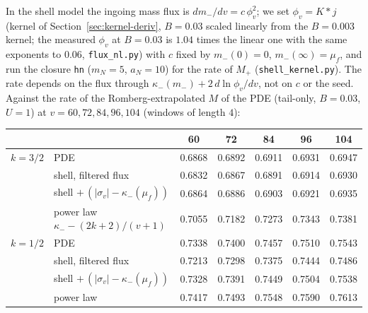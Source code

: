 \documentclass[11pt]{article}
\begin{document}
In the shell model the ingoing mass flux is $dm_-/dv=c\,\phi_v^2$; we set $\phi_v=K\!*\!j$ (kernel of Section~\ref{sec:kernel-deriv}, $B=0.03$ scaled linearly from the $B=0.003$ kernel; the measured $\phi_v$ at $B=0.03$ is $1.04$ times the linear one with the same exponents to $0.06$, \texttt{flux\_nl.py}) with $c$ fixed by $m_-(0)=0$, $m_-(\infty)=\mu_f$, and run the closure \texttt{hn} ($m_N=5$, $a_N=10$) for the rate of $M_+$ (\texttt{shell\_kernel.py}). The rate depends on the flux through $\kappa_-(m_-)+2\,d\ln\phi_v/dv$, not on $c$ or the seed. Against the rate of the Romberg-extrapolated $M$ of the PDE (tail-only, $B=0.03$, $U=1$) at $v=60,72,84,96,104$ (windows of length $4$):
\begin{center}\small
\begin{tabular}{llccccc}
\toprule
 & & 60 & 72 & 84 & 96 & 104\\
\midrule
$k=3/2$ & PDE & 0.6868 & 0.6892 & 0.6911 & 0.6931 & 0.6947\\
 & shell, filtered flux & 0.6832 & 0.6867 & 0.6891 & 0.6914 & 0.6930\\
 & shell $+\,(|\sigma_v|-\kappa_-(\mu_f))$ & 0.6864 & 0.6886 & 0.6903 & 0.6921 & 0.6935\\
 & power law $\kappa_--(2k+2)/(v+1)$ & 0.7055 & 0.7182 & 0.7273 & 0.7343 & 0.7381\\
$k=1/2$ & PDE & 0.7338 & 0.7400 & 0.7457 & 0.7510 & 0.7543\\
 & shell, filtered flux & 0.7213 & 0.7298 & 0.7375 & 0.7444 & 0.7486\\
 & shell $+\,(|\sigma_v|-\kappa_-(\mu_f))$ & 0.7328 & 0.7391 & 0.7449 & 0.7504 & 0.7538\\
 & power law & 0.7417 & 0.7493 & 0.7548 & 0.7590 & 0.7613\\
\bottomrule
\end{tabular}
\end{center}
\end{document}
